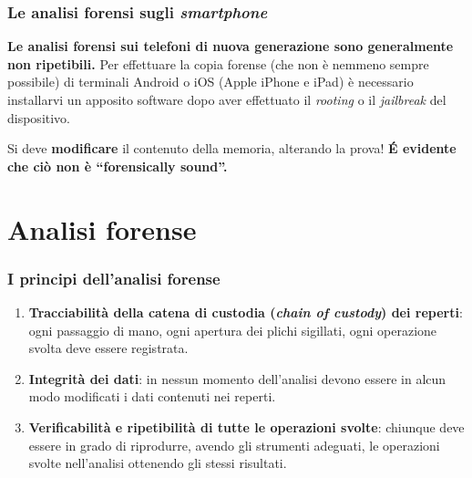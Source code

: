 \documentclass[11pt]{beamer}
\begin{document}
	\begin{frame}
		\frametitle{Le analisi forensi sugli \textit{smartphone}}
		\centering 
		
		\textbf{Le analisi forensi sui telefoni di nuova generazione sono generalmente non ripetibili.} 
		\vfill
		\justifying
		Per effettuare la copia forense (che non è nemmeno sempre possibile) di terminali Android o iOS (Apple iPhone e iPad) è necessario installarvi un apposito software dopo aver effettuato il \textit{rooting} o il \textit{jailbreak} del dispositivo. 
		\vfill

		Si deve \textbf{modificare} il contenuto della memoria, alterando la prova! 
		\vfill
		\centering
		\textbf{\'{E} evidente che ciò non è ``forensically sound''.}
	\end{frame}		
	
	\section{Analisi forense}
	
	\begin{frame}
		\frametitle{I principi dell'analisi forense}
		\begin{enumerate}
			\item \textbf{Tracciabilità della catena di custodia (\textit{chain of custody}) dei reperti}: ogni passaggio di mano, ogni apertura dei plichi sigillati, ogni operazione svolta deve essere registrata.
			\item \textbf{Integrità dei dati}: in nessun momento dell'analisi devono essere in alcun modo modificati i dati contenuti nei reperti.
			\item \textbf{Verificabilità e ripetibilità di tutte le operazioni svolte}: chiunque deve essere in grado di riprodurre, avendo gli strumenti adeguati, le operazioni svolte nell'analisi ottenendo gli stessi risultati.
		\end{enumerate}

	\end{frame}
	
\end{document}

